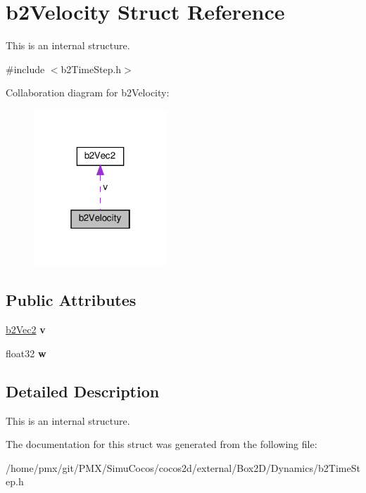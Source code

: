 \hypertarget{structb2Velocity}{}\section{b2\+Velocity Struct Reference}
\label{structb2Velocity}


This is an internal structure.  




{\ttfamily \#include $<$b2\+Time\+Step.\+h$>$}



Collaboration diagram for b2\+Velocity\+:
\nopagebreak
\begin{figure}[H]
\begin{center}
\leavevmode
\includegraphics[width=142pt]{structb2Velocity__coll__graph}
\end{center}
\end{figure}
\subsection*{Public Attributes}
\begin{DoxyCompactItemize}
\item 
\mbox{\label{structb2Velocity_a73b92ceff532491e71b9dbc53eecaa70}} 
\hyperlink{structb2Vec2}{b2\+Vec2} {\bfseries v}
\item 
\mbox{\label{structb2Velocity_a6ce6f6c83ceb95100532d3f2b0485b83}} 
float32 {\bfseries w}
\end{DoxyCompactItemize}


\subsection{Detailed Description}
This is an internal structure. 

The documentation for this struct was generated from the following file\+:\begin{DoxyCompactItemize}
\item 
/home/pmx/git/\+P\+M\+X/\+Simu\+Cocos/cocos2d/external/\+Box2\+D/\+Dynamics/b2\+Time\+Step.\+h\end{DoxyCompactItemize}
